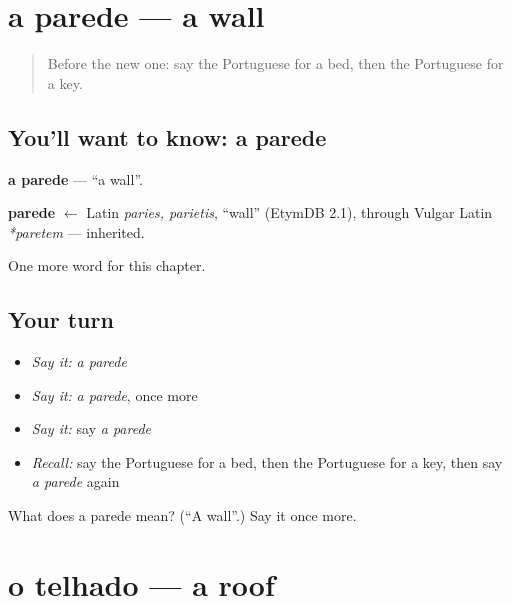 \section[a parede]{a parede — a wall}

\label{lesson:PT-C49-parede}



\begin{quote}
Before the new one: say the Portuguese for a bed, then the Portuguese for a key.
\end{quote}

\subsection*{You'll want to know: a parede}
\textbf{a parede} — \textquotedblleft{}a wall\textquotedblright{}.

\begin{cousinweb}
\textbf{parede} $\leftarrow$ Latin \emph{paries, parietis}, \textquotedblleft{}wall\textquotedblright{} (EtymDB 2.1), through Vulgar Latin \emph{*paretem} — inherited.
\end{cousinweb}

\begin{grammarlens}[title={What you've built}]
One more word for this chapter.
\end{grammarlens}

\subsection*{Your turn}
\begin{itemize}
\raggedright
  \item \emph{Say it:} \emph{a parede}
  \item \emph{Say it:} \emph{a parede}, once more
  \item \emph{Say it:} say \emph{a parede}
  \item \emph{Recall:} say the Portuguese for a bed, then the Portuguese for a key, then say \emph{a parede} again
\end{itemize}

\begin{tcolorbox}[breakable,colback=teal!4,colframe=teal!35!black,title={Before you move on}]
What does a parede mean? (\textquotedblleft{}A wall\textquotedblright{}.) Say it once more.
\end{tcolorbox}
\section[o telhado]{o telhado — a roof}

